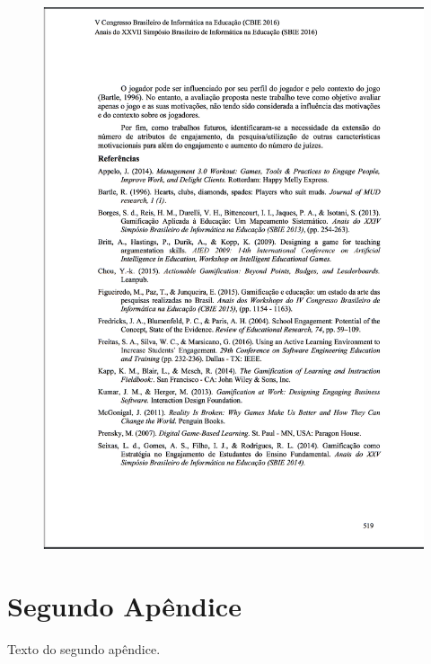 \begin{apendicesenv}
\begin{figure}[h]
	\centering
		\includegraphics[keepaspectratio=true,scale=0.6]{figuras/a10.png}
\end{figure}

\chapter{Segundo Apêndice}

Texto do segundo apêndice.

\end{apendicesenv}
